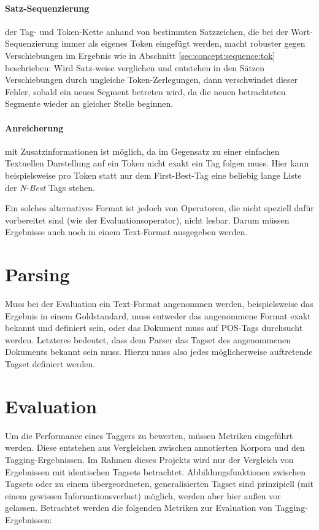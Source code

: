 \paragraph{Satz-Sequenzierung} der Tag- und Token-Kette anhand von bestimmten Satzzeichen, die bei der Wort-Sequenzierung immer als eigenes Token eingefügt werden, macht robuster gegen Verschiebungen im Ergebnis wie in Abschnitt \ref{sec:concept:sequence:tok} beschrieben: Wird Satz-weise verglichen und entstehen in den Sätzen Verschiebungen durch ungleiche Token-Zerlegungen, dann verschwindet dieser Fehler, sobald ein neues Segment betreten wird, da die neuen betrachteten Segmente wieder an gleicher Stelle beginnen.
\paragraph{Anreicherung} mit Zusatzinformationen ist möglich, da im Gegensatz zu einer einfachen Textuellen Darstellung auf ein Token nicht exakt ein Tag folgen muss. Hier kann beispielsweise pro Token statt nur dem First-Best-Tag eine beliebig lange Liste der \textit{N-Best} Tags stehen.

Ein solches alternatives Format ist jedoch von Operatoren, die nicht speziell dafür vorbereitet sind (wie der Evaluationsoperator), nicht lesbar. Darum müssen Ergebnisse auch noch in einem Text-Format ausgegeben werden.

\section{Parsing}
Muss bei der Evaluation ein Text-Format angenommen werden, beispielsweise das Ergebnis in einem Goldstandard, muss entweder das angenommene Format exakt bekannt und definiert sein, oder das Dokument muss auf POS-Tags durchsucht werden. Letzteres bedeutet, dass dem Parser das Tagset des angenommenen Dokuments bekannt sein muss. Hierzu muss also jedes möglicherweise auftretende Tagset definiert werden.

\section{Evaluation}
\label{sec:concept:eval}
Um die Performance eines Taggers zu bewerten, müssen Metriken eingeführt werden. Diese entstehen aus Vergleichen zwischen annotierten Korpora und den Tagging-Ergebnissen. Im Rahmen dieses Projekts wird nur der Vergleich von Ergebnissen mit identischen Tagsets betrachtet. Abbildungsfunktionen zwischen Tagsets oder zu einem übergeordneten, generalisierten Tagset sind prinzipiell (mit einem gewissen Informationsverlust) möglich, werden aber hier außen vor gelassen. Betrachtet werden die folgenden Metriken zur Evaluation von Tagging-Ergebnissen:



